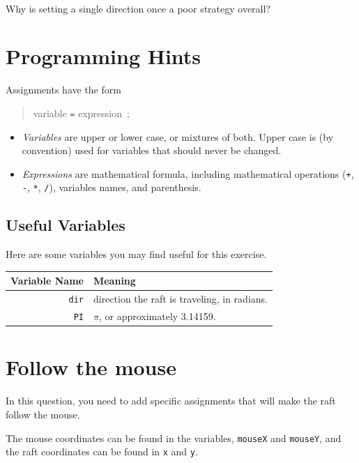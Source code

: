 \documentclass[titlepage]{article}
\newcommand{\drawbox}[1]{\noindent\shadowbox{\parbox{\linewidth-8pt}{\vspace{#1em}~}}\newline}
\begin{document}
~\\
\noindent
Why is setting a single direction once a poor strategy overall?

\drawbox{7}

\section*{Programming Hints}

Assignments have the form 
{\Large\begin{quotation}
variable \verb|=| expression~;
\end{quotation}}

\begin{itemize}
\item {\em Variables\/} are upper or lower case, or mixtures of both. Upper case is (by convention)
used for variables that should never be changed.
\item {\em Expressions\/} are mathematical formula, including mathematical operations
(\verb|+|, \verb|-|, \verb|*|, \verb|/|), variables names, and parenthesis.
\end{itemize}

\subsection*{Useful Variables}

Here are some variables you may find useful for this exercise.

\begin{center}
\noindent
\begin{tabular}{rl}
\hline
{\bf Variable Name}     & Meaning\\
\hline
\verb|dir|              & direction the raft is traveling, in radians.\\
\verb|PI|               & $\pi$, or approximately 3.14159.\\
\hline
\end{tabular}        
\end{center}

\newpage

\section{Follow the mouse}

In this question, you need to add specific assignments that will make the raft follow the mouse.

The mouse coordinates can be found in the variables, \verb|mouseX| and \verb|mouseY|,
and the raft coordinates can be found in \verb|x| and \verb|y|.
\end{document}
